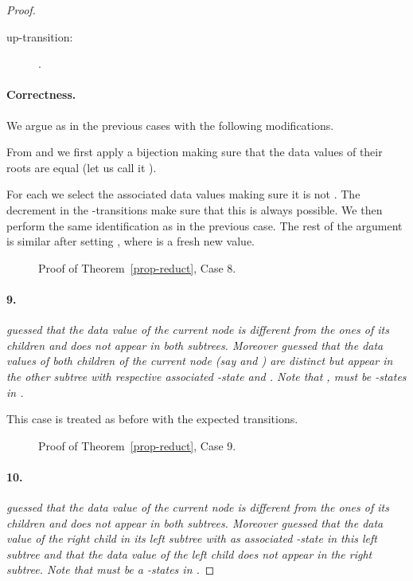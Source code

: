\documentclass{CSML}
\begin{document}
\begin{proof}
\begin{description}
\item[\rm up-transition:] .
\end{description}

\paragraph{\bf Correctness.}  
We argue as in the previous cases with the following modifications.

From  and  we first apply a bijection making sure that the
data values of their roots are equal (let us call it ). 

For each  we select the associated data values making sure
it is not . The decrement in the -transitions make sure
that this is always possible. We then perform the same identification as in the
previous case. 
The rest of the argument is similar after setting
, where  is a fresh new value.

\begin{figure}
\small

\caption{Proof of Theorem~\ref{prop-reduct}, Case 8.}
\label{fig-reduct8}
\end{figure}









\paragraph{\bf 9.} 
\emph{ guessed that the data value  of the
  current node is different from the ones of its children and does not appear in both subtrees. 
  Moreover  guessed that the data values of both children of the current node (say  and ) 
  are distinct but appear in the other subtree with respective associated -state  
  and .
  Note that ,  must be -states in .}

\noindent 
This case is treated as before with the expected transitions.

\begin{figure}
\small

\caption{Proof of Theorem~\ref{prop-reduct}, Case 9.}
\label{fig-reduct9}
\end{figure}




\paragraph{\bf 10.} 
\emph{ guessed that the data value  of the
  current node is different from the ones of its children and does not appear in both subtrees. 
  Moreover  guessed that the data value  of the right child in its left subtree with  as associated -state in this left subtree
  and that the data value  of
  the left child does not appear in the right subtree. 
  Note that  must be a -states in .}


\end{proof}
\end{document}

